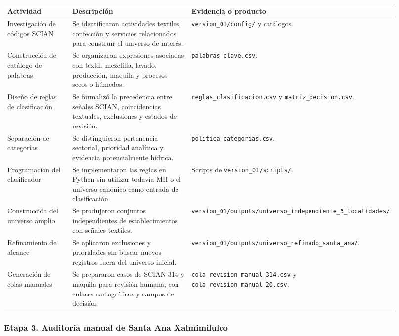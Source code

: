 \documentclass[
  spanish,
]{article}
\newcounter{none} %
\begin{document}
{\def\LTcaptype{none} %
\begin{longtable}[]{@{}p{0.20\linewidth}p{0.44\linewidth}p{0.28\linewidth}@{}}
\toprule\noalign{}
Actividad & Descripción & Evidencia o producto \\
\midrule\noalign{}
\endhead
\bottomrule\noalign{}
\endlastfoot
Investigación de códigos SCIAN & Se identificaron actividades textiles,
confección y servicios relacionados para construir el universo de
interés. & \texttt{version\_01/config/} y catálogos. \\
Construcción de catálogo de palabras & Se organizaron expresiones
asociadas con textil, mezclilla, lavado, producción, maquila y procesos
secos o húmedos. & \texttt{palabras\_clave.csv}. \\
Diseño de reglas de clasificación & Se formalizó la precedencia entre
señales SCIAN, coincidencias textuales, exclusiones y estados de
revisión. & \texttt{reglas\_clasificacion.csv} y
\texttt{matriz\_decision.csv}. \\
Separación de categorías & Se distinguieron pertenencia sectorial,
prioridad analítica y evidencia potencialmente hídrica. &
\texttt{politica\_categorias.csv}. \\
Programación del clasificador & Se implementaron las reglas en Python
sin utilizar todavía MH o el universo canónico como entrada de
clasificación. & Scripts de \texttt{version\_01/scripts/}. \\
Construcción del universo amplio & Se produjeron conjuntos
independientes de establecimientos con señales textiles. &
\texttt{version\_01/outputs/universo\_independiente\_3\_localidades/}. \\
Refinamiento de alcance & Se aplicaron exclusiones y prioridades sin
buscar nuevos registros fuera del universo inicial. &
\texttt{version\_01/outputs/universo\_refinado\_santa\_ana/}. \\
Generación de colas manuales & Se prepararon casos de SCIAN 314 y
maquila para revisión humana, con enlaces cartográficos y campos de
decisión. & \texttt{cola\_revision\_manual\_314.csv} y
\texttt{cola\_revision\_manual\_20.csv}. \\
\end{longtable}
}

\subsubsection{Etapa 3. Auditoría manual de Santa Ana
Xalmimilulco}\label{etapa-3-auditoruxeda-manual-de-santa-ana-xalmimilulco}
\end{document}
